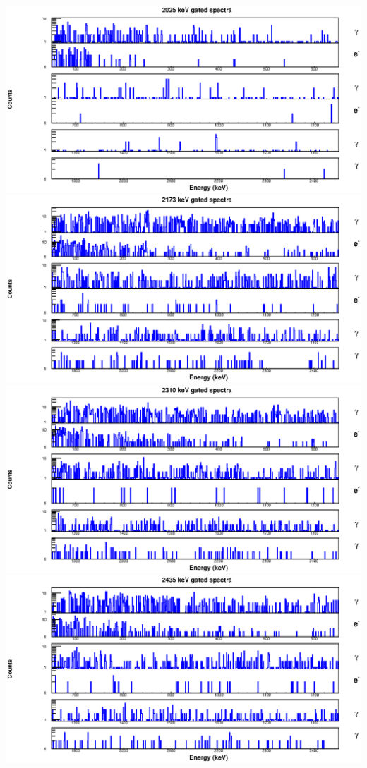 \begin{landscape}
\includegraphics[scale=1.2]{154Gd_Appendix/2025_combined.eps}
\includegraphics[scale=1.2]{154Gd_Appendix/2173_combined.eps}
\includegraphics[scale=1.2]{154Gd_Appendix/2310_combined.eps}
\includegraphics[scale=1.2]{154Gd_Appendix/2435_combined.eps}

\end{landscape}
